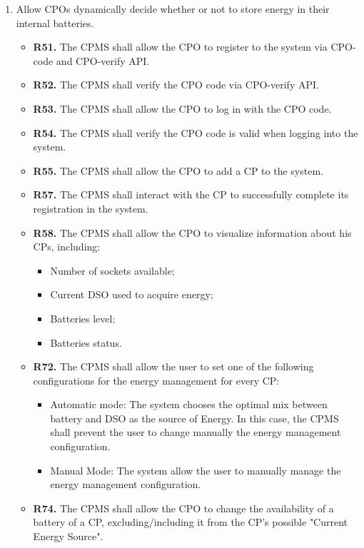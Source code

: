 \documentclass{Configuration_Files/PoliMi3i_thesis}
\begin{document}
\begin{enumerate}[label=\textbf{G\arabic*}]
    \item Allow CPOs dynamically decide whether or not to store energy in their internal batteries.
        \begin{itemize}
            \item \textbf{R51.} The CPMS shall allow the CPO to register to the system via CPO-code and CPO-verify API.
            \item \textbf{R52.} The CPMS shall verify the CPO code via CPO-verify API.
            \item \textbf{R53.} The CPMS shall allow the CPO to log in with the CPO code.
            \item \textbf{R54.} The CPMS shall verify the CPO code is valid when logging into the system.
            \item \textbf{R55.} The CPMS shall allow the CPO to add a CP to the system.
            \item \textbf{R57.} The CPMS shall interact with the CP to successfully complete its registration in the system.
            \item \textbf{R58.} The CPMS shall allow the CPO to visualize information about his CPs, including:
                \begin{itemize}
                    \item Number of sockets available;
                    \item Current DSO used to acquire energy;
                    \item Batteries level;
                    \item Batteries status.
                \end{itemize}
            \item \textbf{R72.} The CPMS shall allow the user to set one of the following configurations for the energy management for every CP:
                \begin{itemize}
                    \item Automatic mode: The system chooses the optimal mix between battery and DSO as the source of Energy. In this case, the CPMS shall prevent the user to change manually the energy management configuration.
                    \item Manual Mode: The system allow the user to manually  manage the energy management configuration.
                \end{itemize}
            \item \textbf{R74.} The CPMS shall allow the CPO to change the availability of a battery of a CP, excluding/including it from the CP's possible "Current Energy Source".

\end{itemize}
\end{enumerate}
\end{document}
